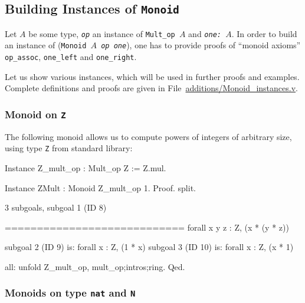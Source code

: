 \subsection{Building Instances of \texttt{Monoid}}
Let \texttt{$A$} be some type, \texttt{{\it op}} an instance of 
\texttt{Mult\_op $A$} and \texttt{\it one: $A$}.
In order to build an instance of (\texttt{Monoid $A$ {\it op} {\it one}}),
one has to provide proofs of ``monoid axioms'' \texttt{ op\_assoc},
\texttt{one\_left} and \texttt{one\_right}.

Let us show various instances, which will be used in further proofs and examples.
Complete definitions and proofs are given in 
File~\href{../theories/html/hydras.additions.Monoid_instances.html}{additions/Monoid\_instances.v}.


\subsubsection{Monoid on \texttt{Z}}
The following monoid allows us to compute powers of integers of arbitrary size, 
using type \texttt{Z} from standard library:

\begin{Coqsrc}
Instance Z_mult_op : Mult_op Z := Z.mul.

Instance ZMult : Monoid  Z_mult_op 1.
Proof. 
  split.
\end{Coqsrc}

\begin{Coqanswer}
3 subgoals, subgoal 1 (ID 8)
  
  ============================
   forall x y z : Z, (x * (y * z))%

subgoal 2 (ID 9) is:
 forall x : Z, (1 * x)%
subgoal 3 (ID 10) is:
 forall x : Z, (x * 1)%
\end{Coqanswer}

\begin{Coqsrc}
    all: unfold Z_mult_op, mult_op;intros;ring.
Qed.
\end{Coqsrc}


\subsubsection{Monoids on type \texttt{nat} and \texttt{N}}
\label{nat-monoids}

